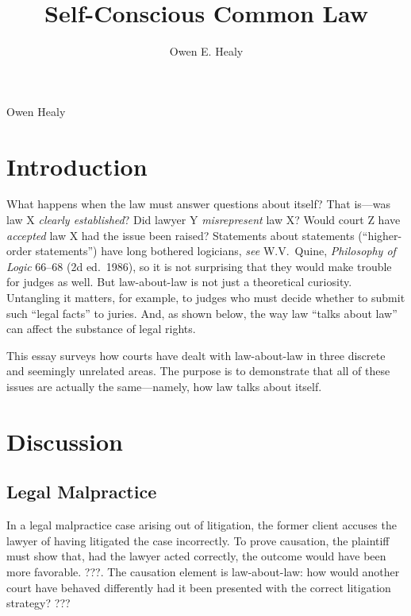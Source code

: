 \documentclass[
  12pt,
  letterpaper,
]{scrartcl}
\title{Self-Conscious Common Law}
\author{Owen E. Healy}
\begin{document}
\begin{center}
{\noindent Owen Healy}

\end{center}


\vspace{-5.0ex}%
\section{Introduction}

What happens when the law must answer questions about itself? That is---was law
X \emph{clearly established}? Did lawyer Y \emph{misrepresent} law X? Would
court Z have \emph{accepted} law X had the issue been raised? Statements about
statements (``higher-order statements'') have long bothered logicians,
\textit{see} W.V.~Quine, \textit{Philosophy of Logic} 66--68 (2d ed.~1986), so
it is not surprising that they would make trouble for judges as well. But
law-about-law is not just a theoretical curiosity. Untangling it matters, for
example, to judges who must decide whether to submit such ``legal facts'' to
juries. And, as shown below, the way law ``talks about law'' can affect the
substance of legal rights.

This essay surveys how courts have dealt with law-about-law in three discrete
and seemingly unrelated areas. The purpose is to demonstrate that all of these
issues are actually the same---namely, how law talks about itself.

\section{Discussion}

\subsection{Legal Malpractice}

In a legal malpractice case arising out of litigation, the former client
accuses the lawyer of having litigated the case incorrectly. To prove
causation, the plaintiff must show that, had the lawyer acted correctly, the
outcome would have been more favorable. ???. The causation element is
law-about-law: how would another court have behaved differently had it been
presented with the correct litigation strategy? ???
\end{document}
